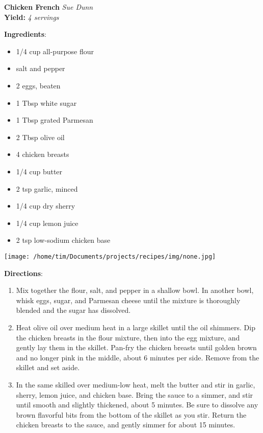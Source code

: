 \documentclass[11pt, twoside, openany]{book}
\begin{document}
\noindent\begin{minipage}[t]{\linewidth}%
{\Large\textbf{Chicken French}} \label{chicken-french}\hfill\textit{Sue Dunn}\\
\textbf{Yield:} \textit{4 servings}\\
\noindent\begin{minipage}[t]{0.78\linewidth}%
\textbf{Ingredients}:\vspace{-3mm}
\begin{multicols}{2}
\begin{itemize}\setlength\itemsep{-1mm}
\item 1/4 cup all-purpose flour
\item salt and pepper
\item 2 eggs, beaten
\item 1 Tbsp white sugar
\item 1 Tbsp grated Parmesan
\item 2 Tbsp olive oil
\item 4 chicken breasts
\item 1/4 cup butter
\item 2 tsp garlic, minced
\item 1/4 cup dry sherry
\item 1/4 cup lemon juice
\item 2 tsp low-sodium chicken base
\end{itemize}
\end{multicols}
\end{minipage}
\noindent\begin{minipage}[t]{0.18\linewidth}
\centering \strut\vspace*{-\baselineskip}\newline
\texttt{[image: /home/tim/Documents/projects/recipes/img/none.jpg]}\\
\end{minipage}\vspace{3mm}
\textbf{Directions}:
\vspace{-3mm}\begin{enumerate}\setlength\itemsep{-1mm}
\item Mix together the flour, salt, and pepper in a shallow bowl. In another bowl, whisk eggs, sugar, and Parmesan cheese until the mixture is thoroughly blended and the sugar has dissolved.
\item Heat olive oil over medium heat in a large skillet until the oil shimmers. Dip the chicken breasts in the flour mixture, then into the egg mixture, and gently lay them in the skillet. Pan-fry the chicken breasts until golden brown and no longer pink in the middle, about 6 minutes per side. Remove from the skillet and set aside.
\item In the same skilled over medium-low heat, melt the butter and stir in garlic, sherry, lemon juice, and chicken base. Bring the sauce to a simmer, and stir until smooth and slightly thickened, about 5 minutes. Be sure to dissolve any brown flavorful bits from the bottom of the skillet as you stir. Return the chicken breasts to the sauce, and gently simmer for about 15 minutes.
\end{enumerate}
\end{minipage}\vspace{8mm}
\end{document}
